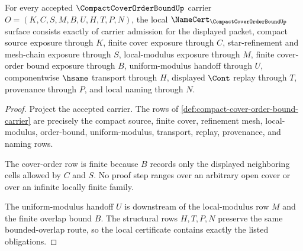 \begin{theorem}
\label{thm:compact-cover-order-bound-namecert-obligations}
For every accepted $\CompactCoverOrderBoundUp$ carrier $O=(K,C,S,M,B,U,H,T,P,N)$, the local $\NameCert_{\CompactCoverOrderBoundUp}$ surface consists exactly of carrier admission for the displayed packet, compact source exposure through $K$, finite cover exposure through $C$, star-refinement and mesh-chain exposure through $S$, local-modulus exposure through $M$, finite cover-order bound exposure through $B$, uniform-modulus handoff through $U$, componentwise $\hsame$ transport through $H$, displayed $\Cont$ replay through $T$, provenance through $P$, and local naming through $N$.
\end{theorem}
\begin{proof}
Project the accepted carrier. The rows of \autoref{def:compact-cover-order-bound-carrier} are precisely the compact source, finite cover, refinement mesh, local-modulus, order-bound, uniform-modulus, transport, replay, provenance, and naming rows.

The cover-order row is finite because $B$ records only the displayed neighboring cells allowed by $C$ and $S$. No proof step ranges over an arbitrary open cover or over an infinite locally finite family.

The uniform-modulus handoff $U$ is downstream of the local-modulus row $M$ and the finite overlap bound $B$. The structural rows $H,T,P,N$ preserve the same bounded-overlap route, so the local certificate contains exactly the listed obligations.
\end{proof}

